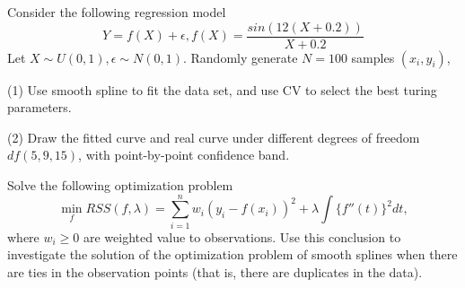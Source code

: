 \begin{problem}[15.1]
    Consider the following regression model
    \begin{equation}
        Y=f(X)+\epsilon,  f(X)=\frac{sin(12(X+0.2))}{X+0.2}
    \end{equation}
    Let $X\sim U(0,1), \epsilon\sim N(0,1)$. Randomly generate $N=100$ samples $(x_i,y_i)$, 

    (1) Use smooth spline to fit the data set, and use CV to select the best turing parameters. 

    (2) Draw the fitted curve and real curve under different degrees of freedom $df (5,9,15)$, with point-by-point confidence band.
\end{problem}

\begin{problem}[15.1]
    Solve the following optimization problem
    \begin{equation*}
        \min_f RSS(f,\lambda)= \sum_{i=1}^n w_i (y_i - f(x_i))^2 + \lambda \int \{f''(t)\}^2dt,
    \end{equation*}
    where $w_i\ge 0$ are weighted value to observations. 
    Use this conclusion to investigate the solution of the optimization problem of smooth splines when there are ties in the observation points (that is, there are duplicates in the data).
\end{problem}

